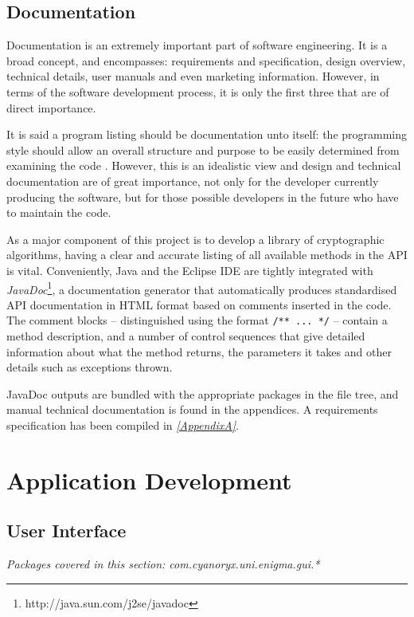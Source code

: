 \subsection{Documentation}

Documentation is an extremely important part of software engineering. It is a broad concept, and encompasses: requirements and specification, design overview, technical details, user manuals and even marketing information. However, in terms of the software development process, it is only the first three that are of direct importance. 

It is said a program listing should be documentation unto itself: the programming style should allow an overall structure and purpose to be easily determined from examining the code \cite{McConnell:2004tv}. However, this is an idealistic view and design and technical documentation are of great importance, not only for the developer currently producing the software, but for those possible developers in the future who have to maintain the code.

As a major component of this project is to develop a library of cryptographic algorithms, having a clear and accurate listing of all available methods in the API is vital. Conveniently, Java and the Eclipse IDE are tightly integrated with \emph{JavaDoc}\footnote{http://java.sun.com/j2se/javadoc}, a documentation generator that automatically produces standardised API documentation in HTML format based on comments inserted in the code. The comment blocks -- distinguished using the format \verb!/** ... */! -- contain a method description, and a number of control sequences that give detailed information about what the method returns, the parameters it takes and other details such as exceptions thrown.

JavaDoc outputs are bundled with the appropriate packages in the file tree, and manual technical documentation is found in the appendices. A requirements specification has been compiled in \emph{\textsection \ref{AppendixA}}.

\section{Application Development}

  \subsection{User Interface}
  \emph{Packages covered in this section: com.cyanoryx.uni.enigma.gui.*}
  
